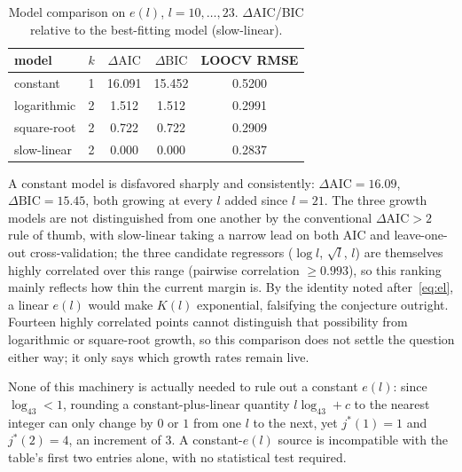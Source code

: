 \documentclass[11pt]{amsart}
\theoremstyle{plain}
\theoremstyle{definition}
\theoremstyle{remark}
\begin{document}
\begin{table}[h]
\centering
\begin{tabular}{l|c|c|c|c}
model & $k$ & $\Delta\mathrm{AIC}$ & $\Delta\mathrm{BIC}$ & LOOCV RMSE \\ \hline
constant & 1 & 16.091 & 15.452 & 0.5200 \\
logarithmic & 2 & 1.512 & 1.512 & 0.2991 \\
square-root & 2 & 0.722 & 0.722 & 0.2909 \\
slow-linear & 2 & 0.000 & 0.000 & 0.2837
\end{tabular}
\caption{Model comparison on $e(l)$, $l=10,\dots,23$. $\Delta$AIC/BIC relative to the best-fitting
model (slow-linear).}
\label{tab:aic}
\end{table}

A constant model is disfavored sharply and consistently: $\Delta\mathrm{AIC}=16.09$,
$\Delta\mathrm{BIC}=15.45$, both growing at every $l$ added since $l=21$. The three growth models
are not distinguished from one another by the conventional $\Delta\mathrm{AIC}>2$
rule of thumb, with slow-linear taking a narrow lead on both AIC and leave-one-out cross-validation;
the three candidate regressors ($\log l$, $\sqrt l$, $l$) are themselves highly correlated over this
range (pairwise correlation $\ge0.993$), so this ranking mainly reflects how thin the current margin
is. By the identity noted after~\eqref{eq:el}, a linear $e(l)$ would make $K(l)$ exponential,
falsifying the conjecture outright. Fourteen highly
correlated points cannot distinguish that possibility from logarithmic or square-root growth, so
this comparison does not settle the question either way; it only says which growth rates remain
live.

None of this machinery is actually needed to rule out a constant $e(l)$: since $\log_43<1$, rounding
a constant-plus-linear quantity $l\log_43+c$ to the nearest integer can only change by $0$ or $1$
from one $l$ to the next, yet $j^*(1)=1$ and $j^*(2)=4$, an increment of $3$. A constant-$e(l)$
source is incompatible with the table's first two entries alone, with no statistical test required.
\end{document}
